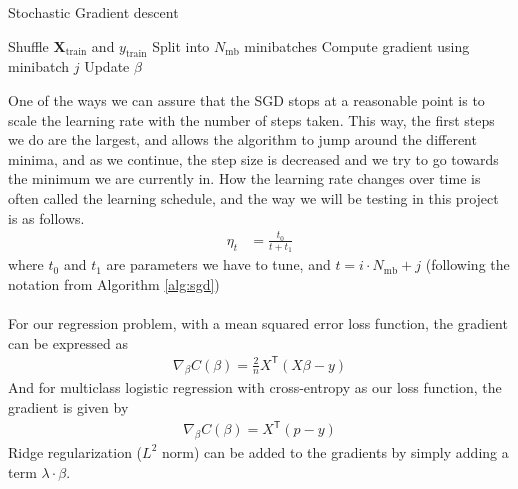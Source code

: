 \documentclass[a4paper]{article}
\newcommand{\XX}{\mathbf{X}}
\newcommand{\T}{\mathsf{T}}
\begin{document}
\begin{algorithm}[H]
\caption{Stochastic Gradient descent}
\begin{algorithmic}[1]
\State Shuffle $\XX_{\text{train}}$ and $y_{\text{train}}$
\State Split into $N_{\text{mb}}$ minibatches
\State Compute gradient using minibatch $j$
\State Update $\beta$
\EndFor
\EndFor
\end{algorithmic}
\label{alg:sgd}
\end{algorithm}
One of the ways we can assure that the SGD stops at a reasonable point is to scale the learning rate with the number of steps taken. This way, the first steps we do are the largest, and allows the algorithm to jump around the different minima, and as we continue, the step size is decreased and we try to go towards the minimum we are currently in. How the learning rate changes over time is often called the learning schedule, and the way we will be testing in this project is as follows.
\begin{align*}
	\eta_t &= \frac{t_0}{t + t_1}
\end{align*}
where $t_0$ and $t_1$ are parameters we have to tune, and $t = i\cdot N_{\text{mb}} + j$ (following the notation from Algorithm \ref{alg:sgd})
\\\\
For our regression problem, with a mean squared error loss function, the gradient can be expressed as
\begin{align*}
	\nabla_{\beta}C(\beta) = \frac{2}{n}X^\T(X\beta-y)
\end{align*}
And for multiclass logistic regression with cross-entropy as our loss function, the gradient is given by
\begin{align*}
	\nabla_{\beta}C(\beta) = X^\T(p-y)
\end{align*}
Ridge regularization ($L^2$ norm) can be added to the gradients by simply adding a term $\lambda \cdot \beta$.
\end{document}
